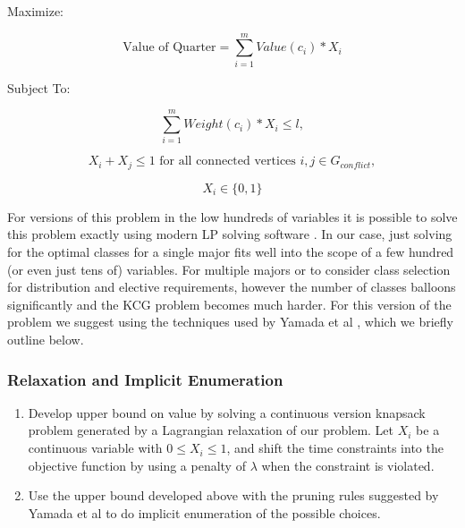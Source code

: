 \documentclass[11pt]{article} %
\begin{document}
Maximize:

\begin{equation}
    \text{Value of Quarter} = \sum_{i=1}^m Value(c_i) * X_i
\end{equation}

Subject To: 

\begin{equation}
\sum_{i=1}^m Weight(c_i) * X_i \leq l,
\end{equation}

\begin{equation}
X_i + X_j \leq 1 \text{ for all connected vertices } i, j \in G_{conflict},
\end{equation}

\begin{equation}
X_i \in \{0, 1\}
\end{equation}

For versions of this problem in the low hundreds of variables it is possible 
to solve this problem exactly using modern LP solving software 
\cite{yamada:heuristic}. In our case, just solving for the optimal classes for 
a single major fits well into the scope of a few hundred (or even just tens of) 
variables. For multiple majors or to consider class selection
for distribution and elective requirements, however the number of classes
balloons significantly and the KCG problem becomes much harder. For this version
of the problem we suggest using the techniques used by Yamada et al
\cite{yamada:heuristic}, which we briefly outline below.

\subsubsection{Relaxation and Implicit Enumeration} \begin{enumerate} \item
Develop upper bound on value by solving a continuous version knapsack problem
generated by a Lagrangian relaxation of our problem. Let $X_i$ be a continuous
variable with $0 \leq X_i \leq 1$, and shift the time constraints into the
objective function by using a penalty of $\lambda$ when the constraint is
violated.  \item Use the upper bound developed above with the pruning rules
suggested by Yamada et al \cite{yamada:heuristic} to do implicit enumeration of
the possible choices.  \end{enumerate}
\end{document}

